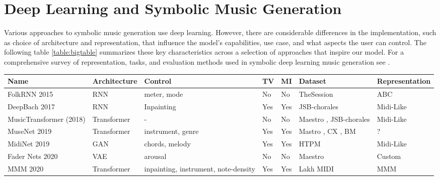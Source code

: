 \section{Deep Learning and Symbolic Music Generation}
Various approaches to symbolic music generation use deep learning. However, there are considerable differences in the implementation, such as choice of architecture and representation, that influence the model's capabilities, use case, and what aspects the user can control. The following table \ref{table:bigtable} summarizes these key characteristics across a selection of approaches that inspire our model. For a comprehensive survey of representation, tasks, and evaluation methods used in symbolic deep learning music generation see \cite{Ji_Yang_Luo_survey_symbolic_2024}.

\begin{table}[H]
    \centering
    \renewcommand{\arraystretch}{1.2} %
    \setlength{\tabcolsep}{3pt} %
    \scriptsize %
    \begin{tabular}{|p{2.5cm}|p{1.8cm}|p{3cm}|p{1cm}|p{1cm}|p{3cm}|p{2.5cm}|}
        \hline
        \textbf{Name} & \textbf{Architecture} & \textbf{Control} & \textbf{TV} & \textbf{MI} & \textbf{Dataset} & \textbf{Representation} \\
        \hline
        FolkRNN 2015 \cite{Sturm_Ben-Tal_2016} & RNN & meter, mode & No & No & TheSession \cite{sessionfolkdata} & ABC\\
        DeepBach 2017 \cite{Hadjeres_Pachet_Nielsen_2017} & RNN & Inpainting & Yes & Yes & JSB-chorales \cite{jsbchorales} & Midi-Like\\ 
        MusicTransformer (2018) \cite{Huang_Vaswani_Uszkoreit_Shazeer_Simon_Hawthorne_Dai_Hoffman_Dinculescu_Eck_2018} & Transformer & - & No & No & Maestro \cite{hawthorne2018maestro},  JSB-chorales\cite{jsbchorales} & Midi-Like\\
        MuseNet 2019 \cite{Christine_2019} & Transformer & instrument, genre & Yes & Yes & Mastro \cite{hawthorne2018maestro}, CX \cite{classicalarchives}, BM \cite{bitmidi} & ?\\
        MidiNet 2019 \cite{midinet} & GAN & chords, melody & Yes & Yes & HTPM \cite{hooktheorypopmidi} & Midi-Like\\
        Fader Nets 2020\cite{Tan_Herremans_2020} & VAE & arousal & No & No & Maestro \cite{hawthorne2018maestro} & Custom \\
        MMM 2020 \cite{Ens_Pasquier_2020_MMM} & Transformer & inpainting, instrument, note-density & Yes & Yes & Lakh MIDI \cite{Raffel_2016} & MMM\\

\end{tabular}
\end{table}
